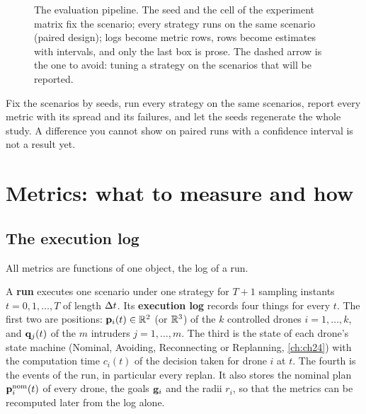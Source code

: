 \begin{figure}[tb]
  \centering
  \caption{The evaluation pipeline. The seed and the cell of the experiment
  matrix fix the scenario; every strategy runs on the same scenario (paired
  design); logs become metric rows, rows become estimates with intervals, and
  only the last box is prose. The dashed arrow is the one to avoid: tuning a
  strategy on the scenarios that will be reported.}
  \label{fig:ch25-pipeline}
\end{figure}

\begin{keyidea}
Fix the scenarios by seeds, run every strategy on the same scenarios, report
every metric with its spread and its failures, and let the seeds regenerate
the whole study. A difference you cannot show on paired runs with a
confidence interval is not a result yet.
\end{keyidea}

\section{Metrics: what to measure and how}
\label{sec:ch25-metrics}

\subsection{The execution log}

All metrics are functions of one object, the log of a run.

\begin{definition}
\label{def:ch25-log}
A \textbf{run} executes one scenario under one
strategy for $T+1$ sampling instants $t = 0, 1, \dots, T$ of length $\Delta t$. Its
\textbf{execution log} records four things for every
$t$. The first two are positions: $\mathbf{p}_i(t) \in \mathbb{R}^2$ (or $\mathbb{R}^3$) of the
$k$ controlled drones $i = 1, \dots, k$, and $\mathbf{q}_j(t)$ of the $m$
intruders $j = 1, \dots, m$. The third is the state of each drone's state
machine (Nominal, Avoiding, Reconnecting or Replanning, \cref{ch:ch24}) with
the computation time $c_i(t)$ of the decision taken for drone $i$ at $t$.
The fourth is the events of the run, in particular every replan.
It also stores the nominal plan
$\mathbf{p}_i^{\mathrm{nom}}(t)$ of every drone, the goals $\mathbf{g}_i$ and the
radii $r_i$, so that the metrics can be recomputed later from the log alone.
\end{definition}

